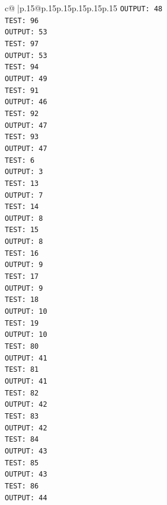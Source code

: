 \documentclass{article}
\begin{document}
{\begin{supertabular}{c@{$\;$}|p{.15\linewidth}@{}p{.15\linewidth}p{.15\linewidth}p{.15\linewidth}p{.15\linewidth}p{.15\linewidth}}
{{{\texttt{OUTPUT: 48} \\
\texttt{TEST: 96} \\
\texttt{OUTPUT: 53} \\
\texttt{TEST: 97} \\
\texttt{OUTPUT: 53} \\
\texttt{TEST: 94} \\
\texttt{OUTPUT: 49} \\
\texttt{TEST: 91} \\
\texttt{OUTPUT: 46} \\
\texttt{TEST: 92} \\
\texttt{OUTPUT: 47} \\
\texttt{TEST: 93} \\
\texttt{OUTPUT: 47} \\
\texttt{TEST: 6} \\
\texttt{OUTPUT: 3} \\
\texttt{TEST: 13} \\
\texttt{OUTPUT: 7} \\
\texttt{TEST: 14} \\
\texttt{OUTPUT: 8} \\
\texttt{TEST: 15} \\
\texttt{OUTPUT: 8} \\
\texttt{TEST: 16} \\
\texttt{OUTPUT: 9} \\
\texttt{TEST: 17} \\
\texttt{OUTPUT: 9} \\
\texttt{TEST: 18} \\
\texttt{OUTPUT: 10} \\
\texttt{TEST: 19} \\
\texttt{OUTPUT: 10} \\
\texttt{TEST: 80} \\
\texttt{OUTPUT: 41} \\
\texttt{TEST: 81} \\
\texttt{OUTPUT: 41} \\
\texttt{TEST: 82} \\
\texttt{OUTPUT: 42} \\
\texttt{TEST: 83} \\
\texttt{OUTPUT: 42} \\
\texttt{TEST: 84} \\
\texttt{OUTPUT: 43} \\
\texttt{TEST: 85} \\
\texttt{OUTPUT: 43} \\
\texttt{TEST: 86} \\
\texttt{OUTPUT: 44} \\
}}}
\end{supertabular}}
\end{document}
